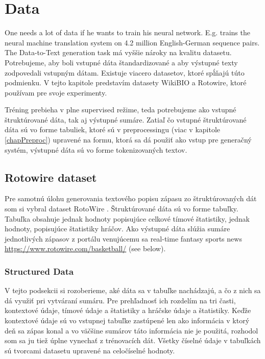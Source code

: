 \chapter{Data}

One needs a lot of data if he wants to train his neural network. E.g. \citep{sennrich2016} trains the neural machine translation system on 4.2 million English-German sequence pairs. The Data-to-Text generation task má vyššie nároky na kvalitu datasetu. Potrebujeme, aby boli vstupné dáta štandardizované a aby výstupné texty zodpovedali vstupným dátam. Existuje viacero datasetov, ktoré spĺňajú túto podmienku. V tejto kapitole predstavím datasety WikiBIO a Rotowire, ktoré používam pre svoje experimenty.

Tréning prebieha v plne supervised režime, teda potrebujeme ako vstupné štruktúrované dáta, tak aj výstupné sumáre. Zatiaľ čo vstupné štruktúrované dáta sú vo forme tabuliek, ktoré sú v preprocessingu (viac v kapitole \ref{chapPreproc}) upravené na formu, ktorá sa dá použiť ako vstup pre generačný systém, výstupné dáta sú vo forme tokenizovaných textov.

\section{Rotowire dataset}

Pre samotnú úlohu generovania textového popisu zápasu zo štruktúrovaných dát som si vybral dataset RotoWire \citep{wiseman2017}. Štruktúrované dáta sú vo forme tabuľky. Tabuľka obsahuje jednak hodnoty popisujúce celkové tímové štatistiky, jednak hodnoty, popisujúce štatistiky hráčov. Ako výstupné dáta slúžia sumáre jednotlivých zápasov z portálu venujúcemu sa real-time fantasy sports news \url{https://www.rotowire.com/basketball/} (see below).

\subsection{Structured Data} \label{structured_data_rotowire}

V tejto podsekcii si rozoberieme, aké dáta sa v tabuľke nachádzajú, a čo z nich sa dá využiť pri vytváraní sumáru. Pre prehľadnosť ich rozdelím na tri časti, kontextové údaje, tímové údaje a štatistiky a hráčske údaje a štatistiky. Keďže kontextové údaje sú vo vstupnej tabuľke zastúpené len ako informácia v ktorý deň sa zápas konal a vo väčšine sumárov táto informácia nie je použitá, rozhodol som sa ju tiež úplne vynechať z trénovacích dát. Všetky číselné údaje v tabuľkách sú tvorcami datasetu upravené na celočíselné hodnoty.

